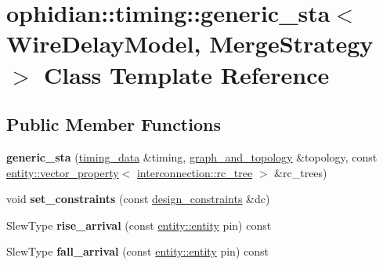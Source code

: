 \hypertarget{classophidian_1_1timing_1_1generic__sta}{\section{ophidian\-:\-:timing\-:\-:generic\-\_\-sta$<$ Wire\-Delay\-Model, Merge\-Strategy $>$ Class Template Reference}
\label{classophidian_1_1timing_1_1generic__sta}
}
\subsection*{Public Member Functions}
\begin{DoxyCompactItemize}
\item 
\hypertarget{classophidian_1_1timing_1_1generic__sta_adaafd000a89273e44af67ade13b5f101}{{\bfseries generic\-\_\-sta} (\hyperlink{structophidian_1_1timing_1_1timing__data}{timing\-\_\-data} \&timing, \hyperlink{structophidian_1_1timing_1_1graph__and__topology}{graph\-\_\-and\-\_\-topology} \&topology, const \hyperlink{classophidian_1_1entity_1_1vector__property}{entity\-::vector\-\_\-property}$<$ \hyperlink{classophidian_1_1interconnection_1_1rc__tree}{interconnection\-::rc\-\_\-tree} $>$ \&rc\-\_\-trees)}\label{classophidian_1_1timing_1_1generic__sta_adaafd000a89273e44af67ade13b5f101}

\item 
\hypertarget{classophidian_1_1timing_1_1generic__sta_aaca1caf94c74f09ed8a4fb8121b1d822}{void {\bfseries set\-\_\-constraints} (const \hyperlink{structophidian_1_1timing_1_1design__constraints}{design\-\_\-constraints} \&dc)}\label{classophidian_1_1timing_1_1generic__sta_aaca1caf94c74f09ed8a4fb8121b1d822}

\item 
\hypertarget{classophidian_1_1timing_1_1generic__sta_a57583f3e0e579c2f263066399a329b83}{Slew\-Type {\bfseries rise\-\_\-arrival} (const \hyperlink{classophidian_1_1entity_1_1entity}{entity\-::entity} pin) const }\label{classophidian_1_1timing_1_1generic__sta_a57583f3e0e579c2f263066399a329b83}

\item 
\hypertarget{classophidian_1_1timing_1_1generic__sta_ad3dfa566d6f456ff72fae31e9f56e2df}{Slew\-Type {\bfseries fall\-\_\-arrival} (const \hyperlink{classophidian_1_1entity_1_1entity}{entity\-::entity} pin) const }\label{classophidian_1_1timing_1_1generic__sta_ad3dfa566d6f456ff72fae31e9f56e2df}


\end{DoxyCompactItemize}
